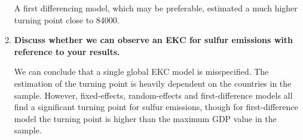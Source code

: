 \documentclass{scrartcl}
\begin{document}
\begin{enumerate}
	A first differencing model, which may be preferable, estimated a much higher turning point close to 84000. 
	
	\item \textbf{Discuss whether we can observe an EKC for sulfur emissions with reference to your results.}
	
	We can conclude that a single global EKC model is misspecified. The estimation of the turning point is heavily dependent on the countries in the sample. However, fixed-effects, random-effects and first-difference models all find a significant turning point for sulfur emissions, though for first-difference model the turning point is higher than the maximum GDP value in the sample.
	
	\end{enumerate}
	


	
\end{document}
